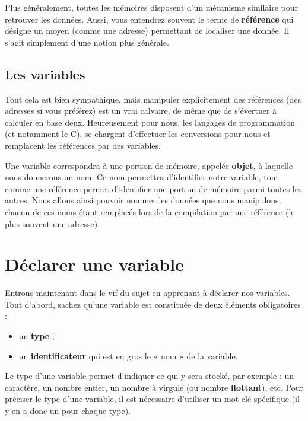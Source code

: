 \begin{infobox}
  Plus généralement, toutes les mémoires disposent d'un mécanisme
  similaire pour retrouver les données.  Aussi, vous entendrez souvent
  le terme de \textbf{référence} qui désigne un moyen (comme une
  adresse) permettant de localiser une donnée. Il s'agit simplement
  d'une notion plus générale.
\end{infobox}

\subsection{Les variables}
\label{les-variables}

Tout cela est bien sympathique, mais manipuler explicitement des
références (des adresses si vous préférez) est un vrai calvaire, de
même que de s'évertuer à calculer en base deux. Heureusement pour
nous, les langages de programmation (et notamment le C), se chargent
d'effectuer les conversions pour nous et remplacent les références par
des variables.

Une variable correspondra à une portion de mémoire, appelée
\textbf{objet}, à laquelle nous donnerons un nom. Ce nom permettra
d'identifier notre variable, tout comme une référence permet
d'identifier une portion de mémoire parmi toutes les autres. Nous
allons ainsi pouvoir nommer les données que nous manipulons, chacun de
ces noms étant remplacés lors de la compilation par une référence (le
plus souvent une adresse).

\section{Déclarer une variable}
\label{declarer-une-variable}

Entrons maintenant dans le vif du sujet en apprenant à déclarer nos
variables. Tout d'abord, sachez qu'une variable est constituée de deux
éléments obligatoires :

\begin{itemize}
\item
  un \textbf{type} ;
\item
  un \textbf{identificateur} qui est en gros le « nom » de la variable.
\end{itemize}

Le type d'une variable permet d'indiquer ce qui y sera stocké, par
exemple : un caractère, un nombre entier, un nombre à virgule (ou
nombre \textbf{flottant}), etc. Pour préciser le type d'une variable,
il est nécessaire d'utiliser un mot-clé spécifique (il y en a donc un
pour chaque type).

